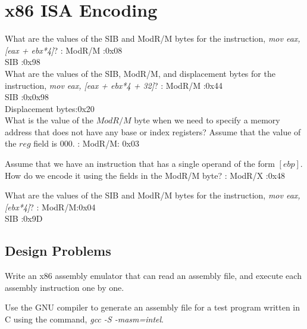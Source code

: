 \section*{x86 ISA Encoding}

\begin{ExerciseList}
\Exercise
What are the values of the SIB and ModR/M bytes for the instruction, {\em mov eax, [eax + ebx*4]}?
\Answer :
ModR/M :0x08 \\
SIB    :0x98\\
\Exercise
What are the values of the SIB, ModR/M, and displacement bytes for the instruction, {\em mov eax, [eax + ebx*4 + 32]}?
\Answer :
ModR/M :0x44\\
SIB    :0x0x98\\
Displacement bytes:0x20\\   
\Exercise
What is the value of the $ModR/M$ byte when we need to specify a memory address that does not have any base
or index registers? Assume that the value of the $reg$ field is 000. 
\Answer:
ModR/M: 0x03

\Exercise[difficulty=1] Assume that we have an instruction that has a single operand of the form $[ebp]$. How do we encode it
using the fields in the ModR/M byte?
\Answer:
ModR/X :0x48

\Exercise[difficulty=1] What are the values of the SIB and ModR/M bytes for the instruction, {\em mov eax, [ebx*4]}?
\Answer:
ModR/M:0x04\\
SIB   :0x9D  

\end{ExerciseList}


\subsection*{Design Problems}

\begin{ExerciseList}
\Exercise
Write an x86 assembly emulator that can read an assembly file, and execute each assembly instruction one by one.

\Exercise
Use the GNU compiler to generate an assembly file for a test program written in C using the command, {\em gcc -S
-masm=intel}. 

\end{ExerciseList}





























